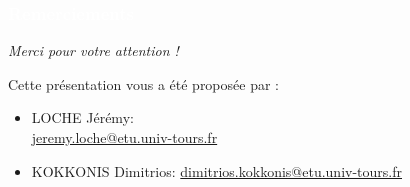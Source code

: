 \documentclass{beamer}
\begin{document}
\begin{frame}
\frametitle{\textcolor{white}{Remerciements}}

\begin{center}
\textit{\huge{Merci pour votre attention !}}
\end{center}

Cette présentation vous a été proposée par :
\begin{itemize}
\item LOCHE Jérémy: \\  \url{jeremy.loche@etu.univ-tours.fr}
\item KOKKONIS Dimitrios: \url{dimitrios.kokkonis@etu.univ-tours.fr}
\end{itemize}

\end{frame}
\end{document}
